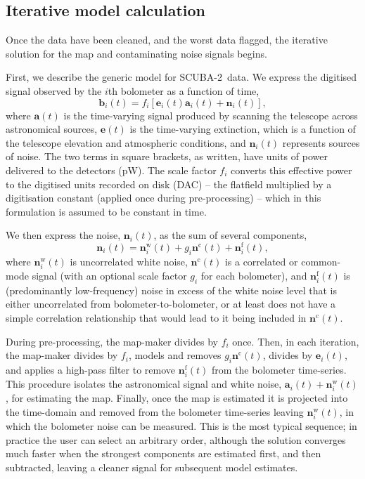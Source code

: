 \documentclass[useAMS,usenatbib,nofootinbib]{mn2e}
\newcommand{\scuba}{SCUBA-2}
\begin{document}
\subsection{Iterative model calculation}
\label{sec:components}

Once the data have been cleaned, and the worst data flagged, the
iterative solution for the map and contaminating noise signals begins.

First, we describe the generic model for \scuba\ data. We express the
digitised signal observed by the $i$th bolometer as a function of
time,
%
\begin{equation}
\mathbf{b}_i(t) = f_i[\mathbf{e}_i(t) \mathbf{a}_i(t) + \mathbf{n}_i(t)],
\label{eq:model}
\end{equation}
%
where $\mathbf{a}(t)$ is the time-varying signal produced by scanning
the telescope across astronomical sources, $\mathbf{e}(t)$ is the
time-varying extinction, which is a function of the telescope
elevation and atmospheric conditions, and $\mathbf{n}_i(t)$ represents
sources of noise. The two terms in square brackets, as written, have
units of power delivered to the detectors (pW). The scale factor $f_i$
converts this effective power to the digitised units recorded on disk
(DAC) -- the flatfield multiplied by a digitisation constant (applied
once during pre-processing) -- which in this formulation is assumed to
be constant in time.

We then express the noise, $\mathbf{n}_i(t)$, as the sum of several
components,
%
\begin{equation}
  \mathbf{n}_i(t) = \mathbf{n}^\mathrm{w}_i(t) +
  g_i\mathbf{n}^\mathrm{c}(t) + \mathbf{n}^\mathrm{f}_i(t),
\label{eq:noise}
\end{equation}
%
where $\mathbf{n}^\mathrm{w}_i(t)$ is uncorrelated white noise,
$\mathbf{n}^\mathrm{c}(t)$ is a correlated or common-mode signal (with
an optional scale factor $g_i$ for each bolometer), and
$\mathbf{n}^\mathrm{f}_i(t)$ is (predominantly low-frequency) noise in
excess of the white noise level that is either uncorrelated from
bolometer-to-bolometer, or at least does not have a simple correlation
relationship that would lead to it being included in
$\mathbf{n}^\mathrm{c}(t)$.

During pre-processing, the map-maker divides by $f_i$ once. Then, in
each iteration, the map-maker divides by $f_i$, models and removes
$g_i\mathbf{n}^\mathrm{c}(t)$, divides by $\mathbf{e}_i(t)$, and
applies a high-pass filter to remove $\mathbf{n}^\mathrm{f}_i(t)$ from
the bolometer time-series. This procedure isolates the astronomical
signal and white noise, $\mathbf{a}_i(t) +
\mathbf{n}^\mathrm{w}_i(t)$, for estimating the map. Finally, once the
map is estimated it is projected into the time-domain and removed from
the bolometer time-series leaving $\mathbf{n}^\mathrm{w}_i(t)$, in
which the bolometer noise can be measured. This is the most typical
sequence; in practice the user can select an arbitrary order, although
the solution converges much faster when the strongest components are
estimated first, and then subtracted, leaving a cleaner signal for
subsequent model estimates.
\end{document}
